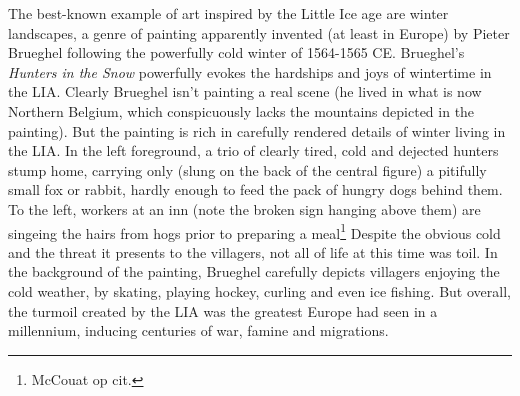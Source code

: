 The best-known example of art inspired by the Little Ice age are winter landscapes, a genre of painting apparently invented (at least in Europe) by Pieter Brueghel following the powerfully cold winter of 1564-1565 CE. Brueghel's \textit{Hunters in the Snow} powerfully evokes the hardships and joys of wintertime in the LIA. Clearly Brueghel isn't painting a real scene (he lived in what is now Northern Belgium, which conspicuously lacks the mountains depicted in the painting). But the painting is rich in carefully rendered details of winter living in the LIA. In the left foreground, a trio of clearly tired, cold and dejected hunters stump home, carrying only (slung on the back of the central figure) a pitifully small fox or rabbit, hardly enough to feed the pack of hungry dogs behind them. To the left, workers at an inn (note the broken sign hanging above them) are singeing the hairs from hogs prior to preparing a meal\footnote{McCouat op cit.} Despite the obvious cold and the threat it presents to the villagers, not all of life at this time was toil. In the background of the painting, Brueghel carefully depicts villagers enjoying the cold weather, by skating, playing hockey, curling and even ice fishing. But overall, the turmoil created by the LIA was the greatest Europe had seen in a millennium, inducing centuries of war, famine and migrations.\\

